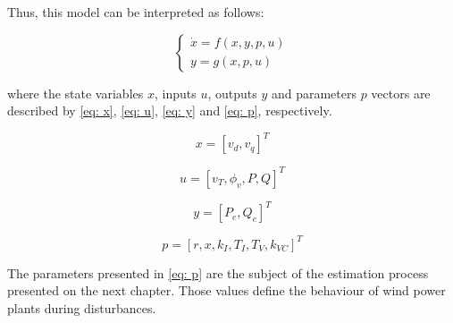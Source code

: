 Thus, this model can be interpreted as follows:

\begin{equation}
	\begin{cases}
		\dot{x} = f(x, y, p, u) \\
		y = g(x, p, u)
	\end{cases}
	\label{eq: xdot}
\end{equation}

\noindent where the state variables $x$, inputs $u$, outputs $y$ and parameters $p$ vectors are described by \eqref{eq: x}, \eqref{eq: u}, \eqref{eq: y} and \eqref{eq: p}, respectively.

\begin{equation}
	x = [v_{d}, v_{q}]^T
	\label{eq: x}
\end{equation}

\begin{equation}
	u = [v_{T}, \phi_{v}, P, Q]^T
	\label{eq: u}
\end{equation}

\begin{equation}
	y = [P_{e}, Q_{e}]^T
	\label{eq: y}
\end{equation}

\begin{equation}
	p = [r, x, k_{I}, T_{I}, T_{V}, k_{VC}]^T
	\label{eq: p}
\end{equation}

The parameters presented in \eqref{eq: p} are the subject of the estimation process presented on the next chapter. Those values define the behaviour of wind power plants during disturbances.